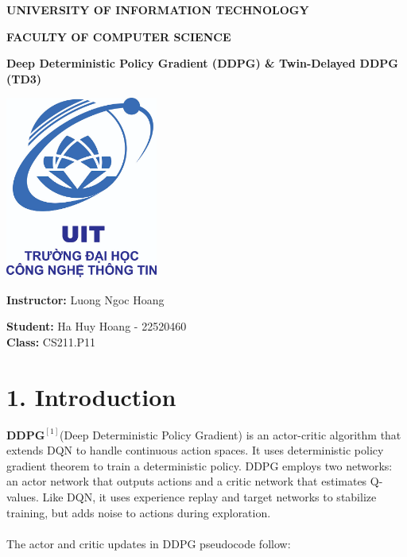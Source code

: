 \documentclass[english, a4paper,12pt]{article}
\date{}
\begin{document}
\begin{titlepage}
\begin{center}
\textbf{UNIVERSITY OF INFORMATION TECHNOLOGY}

\textbf{FACULTY OF COMPUTER SCIENCE}

\vspace{1cm}

\vspace{1cm}

\textbf{Deep Deterministic Policy Gradient (DDPG) \& Twin-Delayed DDPG (TD3)}

\vspace{2cm}
\includegraphics[width= 5cm]{logo.png}
\vspace{2cm}

\textbf{Instructor: } Luong Ngoc Hoang

\vspace{0.5cm}

\textbf{Student:} Ha Huy Hoang - 22520460
\vspace{0.5cm}
\\
\textbf{Class:} CS211.P11
\vspace{2cm}
\tableofcontents
\end{center}
\end{titlepage}

\section*{1. Introduction}
\hspace*{5mm} $\textbf{DDPG}^{[1]} $(Deep Deterministic Policy Gradient) is an actor-critic algorithm that extends DQN to handle continuous action spaces. It uses deterministic policy gradient theorem to train a deterministic policy. DDPG employs two networks: an actor network that outputs actions and a critic network that estimates Q-values. Like DQN, it uses experience replay and target networks to stabilize training, but adds noise to actions during exploration.
\\
\vspace*{-5mm}
\\
\hspace*{5mm} The actor and critic updates in DDPG pseudocode follow:
\begin{center}
    
\end{center}
\vspace*{-2mm}
\end{document}
